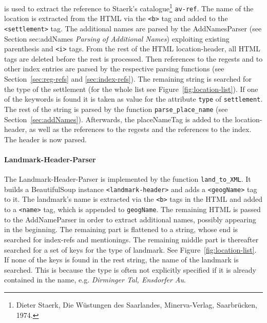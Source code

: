 is used to extract the reference to Staerk's catalogue\footnote{Dieter Staerk, Die Wüstungen des Saarlandes, Minerva-Verlag, Saarbrücken, 1974.} \texttt{av-ref}. The name of the location is extracted from the HTML via the \texttt{<b>} tag and added to the \texttt{<settlement>} tag. The additional names are parsed by the AddNamesParser (see Section sec:addNames \textit{Parsing of Additional Names}) exploiting existing parenthesis and \texttt{<i>} tags. From the rest of the HTML location-header, all HTML tags are deleted before the rest is processed. Then references to the regests and to other index entries are parsed by the respective parsing functions (see Section~\ref{sec:reg-refs} and \ref{sec:index-refs}). The remaining string is searched for the type of the settlement (for the whole list see Figure~\ref{fig:location-list}). If one of the keywords is found it is taken as value for the attribute \texttt{type} of \texttt{settlement}. The rest of the string is parsed by the function \texttt{parse\_place\_name} (see Section~\ref{sec:addNames}). Afterwards, the placeNameTag is added to the location-header, as well as the references to the regests and the references to the index. The header is now parsed.

\paragraph{Landmark-Header-Parser}
The Landmark-Header-Parser is implemented by the function \texttt{land\_to\_XML}. It builds a BeautifulSoup instance \texttt{<landmark-header>} and adds a \texttt{<geogName>} tag to it. The landmark's name is extracted via the \texttt{<b>} tags in the HTML and added to a \texttt{<name>} tag, which is appended to \texttt{geogName}. The remaining HTML is passed to the AddNameParser in order to extract additional names, possibly appearing in the beginning. The remaining part is flattened to a string, whose end is searched for index-refs and mentionings. The remaining middle part is thereafter searched for a set of keys for the type of landmark. See Figure~\ref{fig:location-list}. If none of the keys is found in the rest string, the name of the landmark is searched. This is because the type is often not explicitly specified if it is already contained in the name, e.g. \textit{Dirminger Tal, Ensdorfer Au}.

